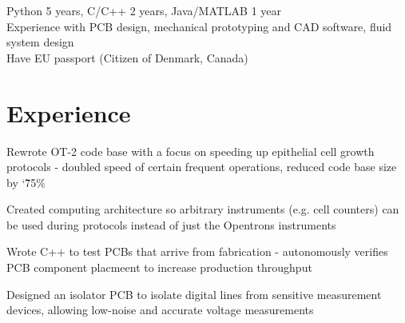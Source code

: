 \documentclass[]{deedy-resume-openfont}
\begin{document}

\begin{minipage}[t]{\textwidth}
	 Python 5 years, C/C++ 2 years, Java/MATLAB 1 year\\
	 Experience with PCB design, mechanical prototyping and CAD software, fluid system design \\
	 Have EU passport (Citizen of Denmark, Canada)
\end{minipage}

\vspace{12pt}

\section{Experience}

\begin{tightemize}
    \item Rewrote OT-2 code base with a focus on speeding up epithelial cell growth protocols - doubled speed of certain frequent operations, reduced code base size by \char`\~ 75\%
    \item Created computing architecture so arbitrary instruments (e.g. cell counters) can be used during protocols instead of just the Opentrons instruments
\end{tightemize}

\vspace{8pt}

\begin{tightemize}
    \item Wrote C++ to test PCBs that arrive from fabrication - autonomously verifies PCB component placmeent to increase production throughput
    \item Designed an isolator PCB to isolate digital lines from sensitive measurement devices, allowing low-noise and accurate voltage measurements
\end{tightemize}
\end{document}
